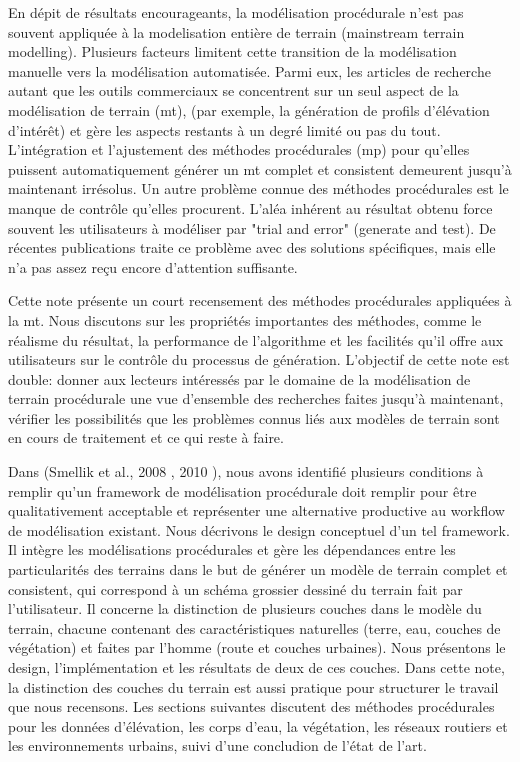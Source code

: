 \documentclass[11pt]{report}
\begin{document}
En dépit de résultats encourageants, la modélisation procédurale n'est pas souvent appliquée à la modelisation entière de terrain (mainstream terrain modelling). Plusieurs facteurs limitent cette transition de la modélisation manuelle vers la modélisation automatisée. Parmi  eux, les articles de recherche autant que les outils commerciaux se concentrent sur un seul aspect de la modélisation de terrain (mt), (par exemple, la génération de profils d'élévation d'intérêt) et gère les aspects restants à un degré limité ou pas du tout. L'intégration et l'ajustement des méthodes procédurales (mp) pour qu'elles puissent automatiquement générer un mt complet et consistent demeurent jusqu'à maintenant irrésolus. Un autre problème connue des méthodes procédurales est le manque de contrôle qu'elles procurent. L'aléa inhérent au résultat obtenu force souvent les utilisateurs à modéliser par "trial and error" (generate and test). De récentes publications traite ce problème avec des solutions spécifiques, mais elle n'a pas assez reçu encore d'attention suffisante. \newline

Cette note présente un court recensement des méthodes procédurales appliquées à la mt. Nous discutons sur les propriétés importantes des méthodes, comme le réalisme du résultat, la performance de l'algorithme et les facilités qu'il offre aux utilisateurs sur le contrôle du processus de génération. L'objectif de cette note est double: donner aux lecteurs intéressés par le domaine de la modélisation de terrain procédurale une vue d'ensemble des recherches faites jusqu'à maintenant, vérifier les possibilités que les problèmes connus liés aux modèles de terrain sont en cours de traitement et ce qui reste à faire. \newline

Dans (Smellik et al., 2008 \cite{smelik-08}, 2010 \cite{smelik-10}), nous avons identifié plusieurs conditions à remplir qu'un framework de modélisation procédurale doit remplir pour être qualitativement acceptable et représenter une alternative productive au workflow de modélisation existant. Nous décrivons le design conceptuel d'un tel framework. Il intègre les modélisations procédurales et gère les dépendances entre les particularités des terrains dans le but de générer un modèle de terrain complet et consistent, qui correspond à un schéma grossier dessiné du terrain fait par l'utilisateur. Il concerne la distinction de plusieurs couches dans le modèle du terrain, chacune contenant des caractéristiques naturelles (terre, eau, couches de végétation) et faites par l'homme (route et couches urbaines). Nous présentons le design, l'implémentation et les résultats de deux de ces couches. Dans cette note, la distinction des couches du terrain est aussi pratique pour  structurer le travail que nous recensons.
Les sections suivantes discutent des méthodes procédurales pour les données d'élévation, les corps d'eau, la végétation, les réseaux routiers et les environnements urbains, suivi d'une concludion de l'état de l'art.  
\end{document}

